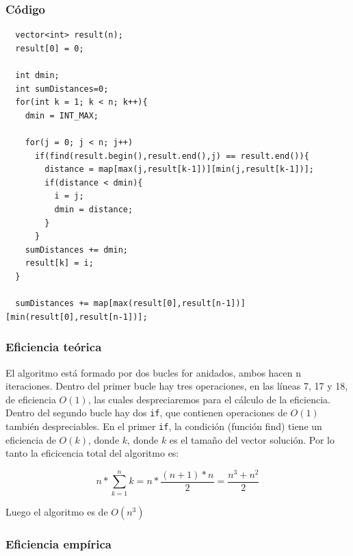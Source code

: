 \documentclass[a4]{article}
\begin{document}
\subsubsection{Código}

\begin{lstlisting}
  vector<int> result(n);
  result[0] = 0;

  int dmin;
  int sumDistances=0;
  for(int k = 1; k < n; k++){
    dmin = INT_MAX;

    for(j = 0; j < n; j++)
      if(find(result.begin(),result.end(),j) == result.end()){
        distance = map[max(j,result[k-1])][min(j,result[k-1])];
        if(distance < dmin){
          i = j;
          dmin = distance;
        }
      }
    sumDistances += dmin;
    result[k] = i;
  }
  
  sumDistances += map[max(result[0],result[n-1])][min(result[0],result[n-1])];  
\end{lstlisting}

\subsubsection{Eficiencia teórica}

El algoritmo está formado por dos bucles for anidados, ambos hacen n iteraciones. Dentro del primer bucle hay tres operaciones, en las líneas 7, 17 y 18, de eficiencia $O(1)$, las cuales despreciaremos para el cálculo de la eficiencia. Dentro del segundo bucle hay dos \verb-if-, que contienen operaciones de $O(1)$ también despreciables. En el primer \verb-if-, la condición (función find) tiene un eficiencia de $O(k)$, donde $k$, donde $k$ es el tamaño del vector solución. Por lo tanto la eficicencia total del algoritmo es:

$$n*\sum_{k=1}^{n}k = n*\frac{(n+1)*n}{2} = \frac{n^3+n^2}{2}$$

Luego el algoritmo es de $O(n^3)$

\subsubsection{Eficiencia empírica}
\end{document}
